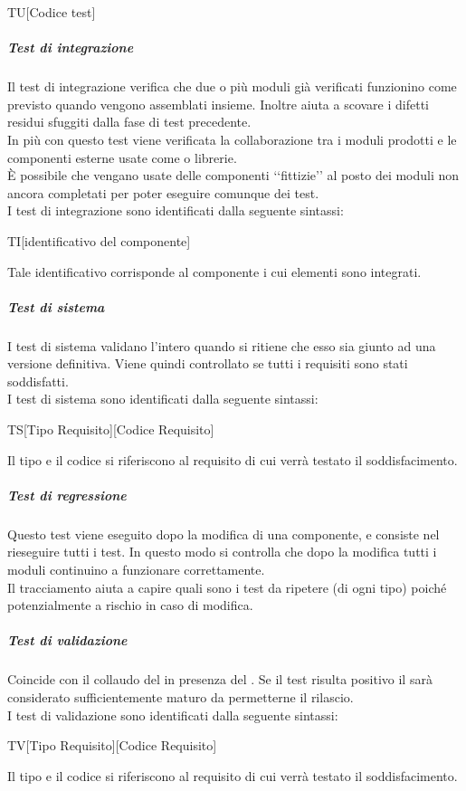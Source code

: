			\begin{center}
				TU[Codice test]
			\end{center}
		\subparagraph{Test di integrazione}
		\label{sec:3.2.1.3.2}
			Il test di integrazione verifica che due o più moduli già verificati funzionino come previsto quando vengono assemblati insieme. Inoltre aiuta a scovare i difetti residui sfuggiti dalla fase di test precedente. \\
			In più con questo test viene verificata la collaborazione tra i moduli prodotti e le componenti esterne usate come  o librerie. \\
			È possibile che vengano usate delle componenti ‘‘fittizie’’ al posto dei moduli non ancora completati per poter eseguire comunque dei test. \\
			I test di integrazione sono identificati dalla seguente sintassi:
			\begin{center}
				TI[identificativo del componente]
			\end{center}
			Tale identificativo corrisponde al componente i cui elementi sono integrati.
		\subparagraph{Test di sistema}
		\label{sec:3.2.1.3.3}
			I test di sistema validano l'intero   quando si ritiene che esso sia giunto ad una versione definitiva. Viene quindi controllato se tutti i requisiti sono stati soddisfatti. \\
			I test di sistema sono identificati dalla seguente sintassi:
			\begin{center}
				TS[Tipo Requisito][Codice Requisito]
			\end{center}
			Il tipo e il codice si riferiscono al requisito di cui verrà testato il soddisfacimento.
		\subparagraph{Test di regressione}
		\label{sec:3.2.1.3.4}
			Questo test viene eseguito dopo la modifica di una componente, e consiste nel rieseguire tutti i test. In questo modo si controlla che dopo la modifica tutti i moduli continuino a funzionare correttamente. \\
			Il tracciamento aiuta a capire quali sono i test da ripetere (di ogni tipo) poiché potenzialmente a rischio in caso di modifica.
		\subparagraph{Test di validazione}
		\label{sec:3.2.1.3.5}
			Coincide con il collaudo del  in presenza del . Se il test risulta positivo il  sarà considerato sufficientemente maturo da permetterne il rilascio. \\
			I test di validazione sono identificati dalla seguente sintassi:
			\begin{center}
				TV[Tipo Requisito][Codice Requisito]
			\end{center}
			Il tipo e il codice si riferiscono al requisito di cui verrà testato il soddisfacimento.
